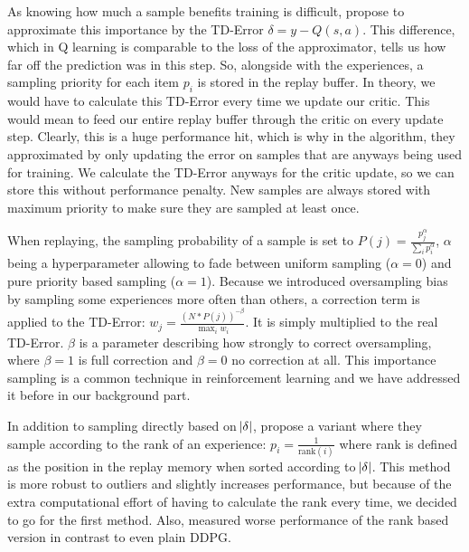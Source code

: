 \documentclass[hyperref,german,beleg]{cgvpub}
\begin{document}
As knowing how much a sample benefits training is difficult, \cite{schaulPrioritizedExperienceReplay2016} propose to approximate this importance by the \ac{TD-Error} $\delta = y - Q(s, a)$. This difference, which in Q learning is comparable to the loss of the approximator, tells us how far off the prediction was in this step. So, alongside with the experiences, a sampling priority for each item $p_i$ is stored in the replay buffer. In theory, we would have to calculate this \ac{TD-Error} every time we update our critic. This would mean to feed our entire replay buffer through the critic on every update step. Clearly, this is a huge performance hit, which is why in the algorithm, they approximated by only updating the error on samples that are anyways being used for training. We calculate the \ac{TD-Error} anyways for the critic update, so we can store this without performance penalty. New samples are always stored with maximum priority to make sure they are sampled at least once.

When replaying, the sampling probability of a sample is set to $P(j) = \frac{p_j^{\alpha}}{\sum_i{p_i^{\alpha}}}$, $\alpha$ being a hyperparameter allowing to fade between uniform sampling ($\alpha=0$) and pure priority based sampling ($\alpha=1$). Because we introduced oversampling bias by sampling some experiences more often than others, a correction term is applied to the \ac{TD-Error}: $w_j = \frac{(N*P(j))^{-\beta}}{\max_i{w_i}}$. It is simply multiplied to the real \ac{TD-Error}. $\beta$ is a parameter describing how strongly to correct oversampling, where $\beta=1$ is full correction and $\beta=0$ no correction at all. This importance sampling is a common technique in reinforcement learning and we have addressed it before in our background part.

In addition to sampling directly based on $\abs{\delta}$, \cite{schaulPrioritizedExperienceReplay2016} propose a variant where they sample according to the rank of an experience: $p_i = \frac{1}{\text{rank}(i)}$ where rank is defined as the position in the replay memory when sorted according to $\abs{\delta}$. This method is more robust to outliers and slightly increases performance, but because of the extra computational effort of having to calculate the rank every time, we decided to go for the first method. Also, \cite{zhaExperienceReplayOptimization2019} measured worse performance of the rank based version in contrast to even plain \ac{DDPG}.
\end{document}
